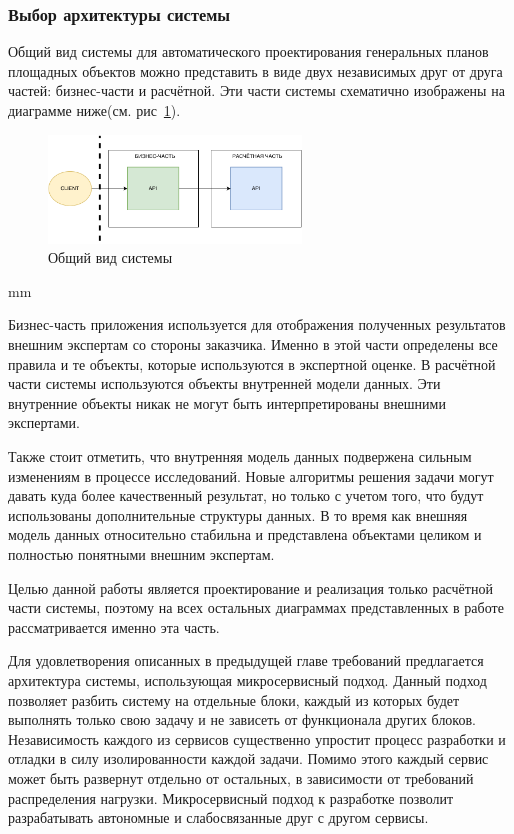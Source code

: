 \subsubsection{\large{Выбор архитектуры системы}}

Общий вид системы для автоматического проектирования генеральных планов площадных объектов можно представить в виде
двух независимых друг от друга частей: бизнес-части и расчётной.
Эти части системы схематично изображены на диаграмме ниже(см. рис\ \ref{pic:architecture__system-diagram}).

\begin{figure}[H]
	\hspace*{-2.5 cm}\includegraphics[width=0.6\textwidth, left]{architecture/pictures/common/system}
	\caption{Общий вид системы}
	\label{pic:architecture__system-diagram}
\end{figure}
 mm

Бизнес-часть приложения используется для отображения полученных результатов внешним экспертам со стороны заказчика.
Именно в этой части определены все правила и те объекты, которые используются в экспертной оценке.
В расчётной части системы используются объекты внутренней модели данных.
Эти внутренние объекты никак не могут быть интерпретированы внешними экспертами.

Также стоит отметить, что внутренняя модель данных подвержена сильным изменениям в процессе исследований.
Новые алгоритмы решения задачи могут давать куда более качественный результат, но только с учетом того, что
будут использованы дополнительные структуры данных. В то время как внешняя модель данных относительно стабильна
и представлена объектами целиком и полностью понятными внешним экспертам.

Целью данной работы является проектирование и реализация только расчётной части системы, поэтому на всех остальных
диаграммах представленных в работе рассматривается именно эта часть.

Для удовлетворения описанных в предыдущей главе требований предлагается архитектура системы,
использующая микросервисный подход. Данный подход позволяет разбить систему на отдельные блоки,
каждый из которых будет выполнять только свою задачу и не зависеть от функционала других блоков.
Независимость каждого из сервисов существенно упростит процесс разработки и отладки в силу изолированности
каждой задачи. Помимо этого каждый сервис может быть развернут отдельно от остальных, в зависимости
от требований распределения нагрузки. Микросервисный подход к разработке позволит разрабатывать
автономные и слабосвязанные друг с другом сервисы.

